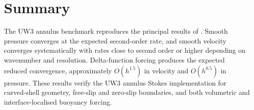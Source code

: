 \documentclass[11pt,a4paper]{article}
\begin{document}


\section{Summary}

The UW3 annulus benchmark reproduces the principal results of \citet{kramer2021}. Smooth pressure converges at the expected second-order rate, and smooth velocity converges systematically with rates close to second order or higher depending on wavenumber and resolution. Delta-function forcing produces the expected reduced convergence, approximately \(O(h^{1.5})\) in velocity and \(O(h^{0.5})\) in pressure. These results verify the UW3 annulus Stokes implementation for curved-shell geometry, free-slip and zero-slip boundaries, and both volumetric and interface-localised buoyancy forcing.



\end{document}
